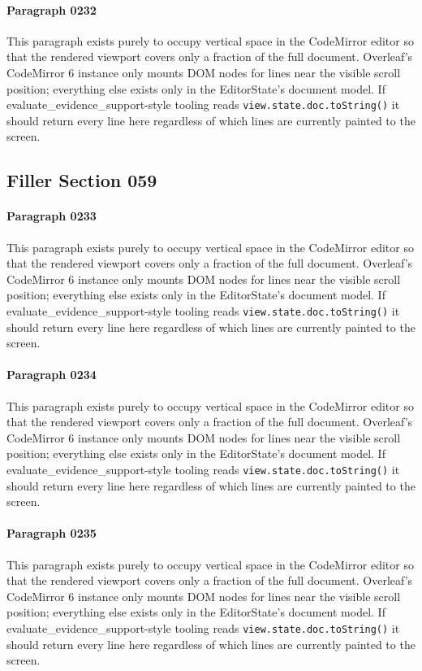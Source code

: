 \documentclass{article}
\begin{document}
\paragraph{Paragraph 0232}
This paragraph exists purely to occupy vertical space in the CodeMirror editor so that the rendered viewport covers only a fraction of the full document. Overleaf's CodeMirror 6 instance only mounts DOM nodes for lines near the visible scroll position; everything else exists only in the EditorState's document model. If evaluate\_evidence\_support-style tooling reads \texttt{view.state.doc.toString()} it should return every line here regardless of which lines are currently painted to the screen.

\subsection{Filler Section 059}
\paragraph{Paragraph 0233}
This paragraph exists purely to occupy vertical space in the CodeMirror editor so that the rendered viewport covers only a fraction of the full document. Overleaf's CodeMirror 6 instance only mounts DOM nodes for lines near the visible scroll position; everything else exists only in the EditorState's document model. If evaluate\_evidence\_support-style tooling reads \texttt{view.state.doc.toString()} it should return every line here regardless of which lines are currently painted to the screen.

\paragraph{Paragraph 0234}
This paragraph exists purely to occupy vertical space in the CodeMirror editor so that the rendered viewport covers only a fraction of the full document. Overleaf's CodeMirror 6 instance only mounts DOM nodes for lines near the visible scroll position; everything else exists only in the EditorState's document model. If evaluate\_evidence\_support-style tooling reads \texttt{view.state.doc.toString()} it should return every line here regardless of which lines are currently painted to the screen.

\paragraph{Paragraph 0235}
This paragraph exists purely to occupy vertical space in the CodeMirror editor so that the rendered viewport covers only a fraction of the full document. Overleaf's CodeMirror 6 instance only mounts DOM nodes for lines near the visible scroll position; everything else exists only in the EditorState's document model. If evaluate\_evidence\_support-style tooling reads \texttt{view.state.doc.toString()} it should return every line here regardless of which lines are currently painted to the screen.
\end{document}
